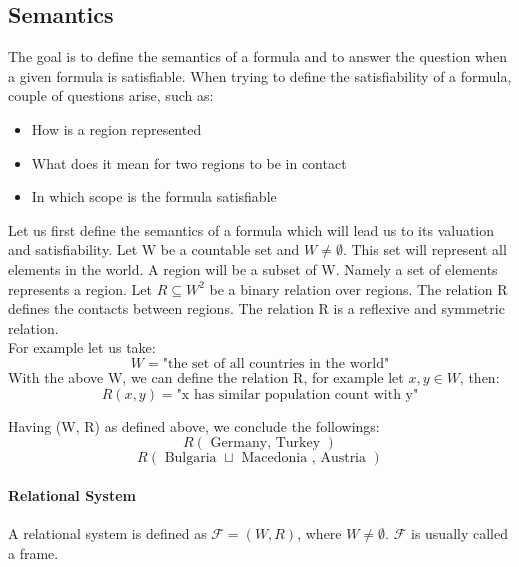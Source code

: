 \documentclass{article}
\begin{document}
	\subsection{Semantics}
The goal is to define the semantics of a formula and to answer the question when a given formula is satisfiable.
When trying to define the satisfiability of a formula, couple of questions arise, such as:
		\begin{itemize}
			\item How is a region represented 
			\item What does it mean for two regions to be in contact
			\item In which scope is the formula satisfiable
		\end{itemize}
Let us first define the semantics of a formula which will lead us to its valuation and satisfiability.
\newline
Let W be a countable set and $W \neq \emptyset$. This set will represent all elements in the world.
A region will be a subset of W. Namely a set of elements represents a region.
Let $R \subseteq W^2$ be a binary relation over regions. The relation R defines the contacts between regions.
The relation R is a reflexive and symmetric relation. \\
For example let us take:
		\begin{equation*}
			W = \text{"the set of all countries in the world"}
		\end{equation*}
With the above W, we can define the relation R, for example let $x, y \in W$, then:
		\begin{equation*}
			R(x,y) = \text{"x has similar population count with y"}
		\end{equation*}

Having (W, R) as defined above, we conclude the followings: 
		\begin{equation*}
			R(\text{ Germany, Turkey })
		 \end{equation*}
		\begin{equation*}
			R(\text{ Bulgaria } \sqcup \text{ Macedonia , Austria })
		 \end{equation*}
	\paragraph{Relational System} A relational system is defined as $\mathcal{F} = (W, R)$, where $W \neq \emptyset$. $\mathcal{F}$ is usually called a frame.
\end{document}
